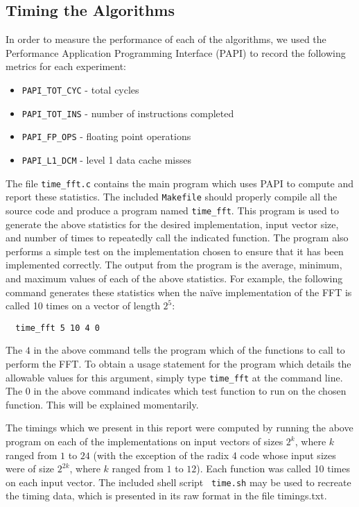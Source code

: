 \documentclass[11 pt]{article}
\begin{document}
\subsection{Timing the Algorithms}

In order to measure the performance of each of the algorithms, we used the
Performance Application Programming Interface (PAPI) to record the following
metrics for each experiment:

\begin{itemize}
\item {\tt PAPI\_TOT\_CYC} - total cycles
\item {\tt PAPI\_TOT\_INS} - number of instructions completed
\item {\tt PAPI\_FP\_OPS}  - floating point operations
\item {\tt PAPI\_L1\_DCM}  - level 1 data cache misses
\end{itemize}

The file {\tt time\_fft.c} contains the main program which uses PAPI to compute
and report these statistics.  The included {\tt Makefile} should properly
compile all the source code and produce a program named {\tt time\_fft}.  This
program is used to generate the above statistics for the desired
implementation, input vector size, and number of times to repeatedly call the
indicated function.  The program also performs a simple test on the
implementation chosen to ensure that it has been implemented correctly.  The
output from the program is the average, minimum, and maximum values of each of
the above statistics.  For example, the following command generates these
statistics when the na\"{i}ve implementation of the FFT is called 10 times on a
vector of length $2^5$:
\begin{verbatim}
  time_fft 5 10 4 0
\end{verbatim}
The $4$ in the above command tells the program which of the functions to call
to perform the FFT.  To obtain a usage statement for the program which details
the allowable values for this argument, simply type {\tt time\_fft} at the
command line.  The $0$ in the above command indicates which test function to
run on the chosen function.  This will be explained momentarily.

The timings which we present in this report were computed by running the above
program on each of the implementations on input vectors of sizes $2^k$, where
$k$ ranged from $1$ to $24$ (with the exception of the radix 4 code whose input
sizes were of size $2^{2k}$, where $k$ ranged from $1$ to $12$).  Each function
was called 10 times on each input vector.  The included shell script {\tt
	time.sh} may be used to recreate the timing data, which is presented in its
raw format in the file timings.txt.
\end{document}
